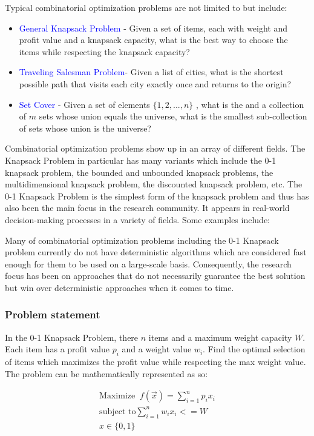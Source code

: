 \documentclass[titlepage]{article}
\begin{document}
Typical combinatorial optimization problems are not limited to but include:
\begin{itemize}
    \item \textcolor{blue}{General Knapsack Problem} - Given a set of items, each with weight and profit value and a knapsack capacity, what is the best way to choose the items while respecting the knapsack capacity?
    \item \textcolor{blue}{Traveling Salesman Problem}- Given a list of cities, what is the shortest possible path that visits each city exactly once and returns to the origin?
    \item \textcolor{blue}{Set Cover} - Given a set of elements $\{1, 2, ..., n\}$ , what is the and a collection of $m$ sets whose union equals the universe, what is the smallest sub-collection of sets whose union is the universe?
\end{itemize}

Combinatorial optimization problems show up in an array of different fields. The Knapsack Problem in particular has many variants which include the 0-1 knapsack problem, the bounded and unbounded knapsack problems, the multidimensional knapsack problem, the discounted knapsack problem, etc. The 0-1 Knapsack Problem is the simplest form of the knapsack problem and thus has also been the main focus in the research community. It appears in real-world decision-making processes in a variety of fields. Some examples include: 

Many of combinatorial optimization problems including the 0-1 Knapsack problem currently do not have deterministic algorithms which are considered fast enough for them to be used on a large-scale basis. Consequently, the research focus has been on approaches that do not necessarily guarantee the best solution but win over deterministic approaches when it comes to time. 

\subsubsection*{Problem statement}
In the 0-1 Knapsack Problem, there $n$ items and a maximum weight capacity $W$. Each item has a profit value $p_i$ and a weight value $w_i$. Find the optimal selection of items which maximizes the profit value while respecting the max weight value. The problem can be mathematically represented as so:

\vskip -0.5cm

\begin{gather}
    \text{Maximize}\;\; f(\Vec{x}) = \sum_{i = 1}^{n} p_i x_i \\
    \text{subject to} \sum_{i = 1}^{n} w_i x_i <= W \\
    x \in \{0, 1\}
\end{gather}
\end{document}
